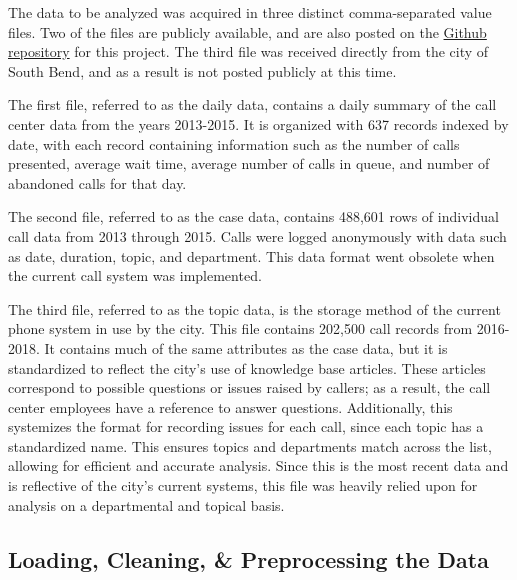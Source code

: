 \documentclass[11pt,twocolumn]{article}
\begin{document}
The data to be analyzed was acquired in three distinct comma-separated value files.  Two of the files are publicly available, and are also posted on the \href{https://github.com/jdbul33/verbose-chainsaw}{Github repository} for this project.  The third file was received directly from the city of South Bend, and as a result is not posted publicly at this time.
\par
The first file, referred to as the daily data, contains a daily summary of the call center data from the years 2013-2015.  It is organized with 637 records indexed by date, with each record containing information such as the number of calls presented, average wait time, average number of calls in queue, and number of abandoned calls for that day.
\par
The second file, referred to as the case data, contains 488,601 rows of individual call data from 2013 through 2015.  Calls were logged anonymously with data such as date, duration, topic, and department.  This data format went obsolete when the current call system was implemented.
\par
The third file, referred to as the topic data, is the storage method of the current phone system in use by the city.  This file contains 202,500 call records from 2016-2018.  It contains much of the same attributes as the case data, but it is standardized to reflect the city's use of knowledge base articles.  These articles correspond to possible questions or issues raised by callers; as a result, the call center employees have a reference to answer questions.  Additionally, this systemizes the format for recording issues for each call, since each topic has a standardized name.  This ensures topics and departments match across the list, allowing for efficient and accurate analysis.  Since this is the most recent data and is reflective of the city's current systems, this file was heavily relied upon for analysis on a departmental and topical basis.

	\subsection{Loading, Cleaning, \& Preprocessing the Data}
\end{document}
